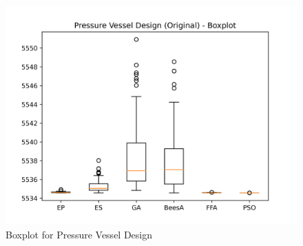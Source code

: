 \begin{figure}[H]
\centering
\caption{Boxplot for Pressure Vessel Design}
\label{fig:pressure_vessel_design_original_boxplot}
\includegraphics[scale=0.5]{images/pressure_vessel_problem_original_boxplot.png}
\end{figure}
